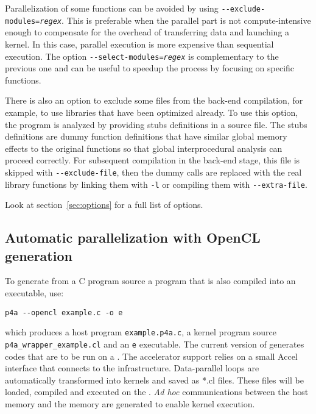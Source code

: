 \documentclass[a4paper]{article}
\begin{document}
Parallelization of some functions can be avoided by using
\texttt{-{}-exclude-modules=\emph{regex}}. This is preferable when the
parallel part is not compute-intensive enough to compensate for
the overhead of transferring data and launching a kernel. In this
case, parallel execution is more expensive than sequential execution. 
The option \texttt{-{}-select-modules=\emph{regex}} is complementary to the
previous one and can be useful to speedup the process by focusing on specific
functions.

There is also an option to exclude some files from the back-end
compilation, for example, to use libraries that have been optimized
already. To use this option,
the program is analyzed by providing stubs definitions in a source
file. The stubs definitions
are dummy function definitions that have similar global memory
effects to the original functions so that \Apips global
interprocedural analysis can proceed correctly. For subsequent compilation
in the back-end stage, this file is skipped with \verb|--exclude-file|, then
the dummy calls are replaced with the real library functions by linking
them with \texttt{-l} or compiling them with \verb|--extra-file|.

Look at section~\ref{sec:options} for a full list of options.



\subsection{Automatic parallelization with OpenCL generation}
\label{sec:autom-parall-with-OpenCL}

To generate from a C program source a \Aopencl program that is also compiled
into an executable, use:
\begin{verbatim}
p4a --opencl example.c -o e
\end{verbatim}
which produces a host program \texttt{example.p4a.c}, a \Aopencl kernel program source 
\texttt{p4a\_wrapper\_example.cl} and an \texttt{e} executable. The current version of 
\Apfa generates \Aopencl codes that are to be run on a \Agpu. 
The \Agpu accelerator support relies on a small \Apfa Accel interface that connects to the
\Aopencl infrastructure. Data-parallel loops are automatically transformed
into \Aopencl kernels and saved as *.cl files. These files 
will be loaded, compiled and executed on the \Agpu. \emph{Ad
  hoc} communications between the host memory and the \Agpu memory are
generated to enable kernel execution. 
\end{document}
